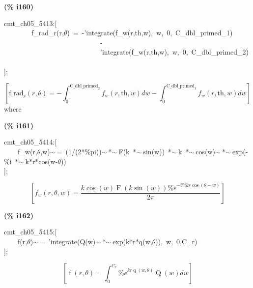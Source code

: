 \documentclass[fleqn]{article}
\begin{document}
\noindent
\begin{minipage}[t]{4.000000em}\color{red}\bfseries
(\% i160)	
\end{minipage}
\begin{minipage}[t]{\textwidth}\color{blue}
cmt\_ch05\_5413:[\\
\ \ \ \ \ \ \ \ f\_rad\_r(r,\ensuremath{\theta})\ =\ -'integrate(f\_w(r,th,w),\ w,\ 0,\ C\_dbl\_primed\_1)\\
\ \ \ \ \ \ \ \ \ \ \ \ \ \ \ \ \ \ \ \ \ \ \ \ \ \ \ \ -\\
\ \ \ \ \ \ \ \ \ \ \ \ \ \ \ \ \ \ \ \ \ \ \ \ \ \ \ \ 'integrate(f\_w(r,th,w),\ w,\ 0,\ C\_dbl\_primed\_2)\\
\\
];
\end{minipage}
\[\displaystyle \tag{\% o160} 
\left[ {{\ensuremath{\mathrm{f\_ rad}}}_r}\left( r\operatorname{,}\theta \right) =-\int_{0}^{{{\ensuremath{\mathrm{C\_ dbl\_ primed}}}_2}}{\left. {f_w}\left( r\operatorname{,}\ensuremath{\mathrm{th}}\operatorname{,}w\right) dw\right.}-\int_{0}^{{{\ensuremath{\mathrm{C\_ dbl\_ primed}}}_1}}{\left. {f_w}\left( r\operatorname{,}\ensuremath{\mathrm{th}}\operatorname{,}w\right) dw\right.}\right] \mbox{}
\]
where


\noindent
\begin{minipage}[t]{4.000000em}\color{red}\bfseries
(\% i161)	
\end{minipage}
\begin{minipage}[t]{\textwidth}\color{blue}
cmt\_ch05\_5414:[\\
\ \ \ \ f\_w(r,\ensuremath{\theta},w)\ensuremath{\sim\ }=\ (1/(2*\%pi))\ensuremath{\sim\ }*\ensuremath{\sim\ }F(k\ *\ensuremath{\sim\ }sin(w))\ *\ensuremath{\sim\ }k\ *\ensuremath{\sim\ }cos(w)\ensuremath{\sim\ }*\ensuremath{\sim\ }exp(-\%i\ *\ensuremath{\sim\ }k*r*cos(w-\ensuremath{\theta}))\\
];
\end{minipage}
\[\displaystyle \tag{\% o161} 
\left[ {f_w}\left( r\operatorname{,}\theta \operatorname{,}w\right) =\frac{k \cos{(w)} \operatorname{F}\left( k \sin{(w)}\right)  {{\% e}^{-\% i k r \cos{\left( \theta -w\right) }}}}{2 \ensuremath{\pi} }\right] \mbox{}
\]


\noindent
\begin{minipage}[t]{4.000000em}\color{red}\bfseries
(\% i162)	
\end{minipage}
\begin{minipage}[t]{\textwidth}\color{blue}
cmt\_ch05\_5415:[\\
\ \ \ \ f(r,\ensuremath{\theta})\ensuremath{\sim\ }=\ 'integrate(Q(w)\ensuremath{\sim\ }*\ensuremath{\sim\ }exp(k*r*q(w,\ensuremath{\theta})),\ w,\ 0,C\_r)\\
];
\end{minipage}
\[\displaystyle \tag{\% o162} 
\left[ \operatorname{f}\left( r\operatorname{,}\theta \right) =\int_{0}^{{C_r}}{\left. {{\% e}^{k r \operatorname{q}\left( w\operatorname{,}\theta \right) }} \operatorname{Q}(w)dw\right.}\right] \mbox{}
\]
\end{document}
